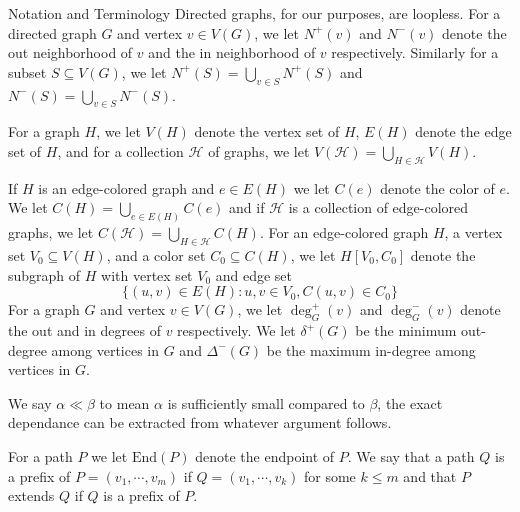 \documentclass[11pt,a4paper]{article}
\newcommand{\End}{\mathrm{End}}
\begin{document}
\begin{section}{Notation and Terminology}
Directed graphs, for our purposes, are loopless. For a directed graph $G$ and vertex $v \in V(G)$, we let $N^+(v)$ and $N^-(v)$ denote the out neighborhood of $v$ and the in neighborhood of $v$ respectively. Similarly for a subset $S \subseteq V(G)$, we let $N^+(S) = \bigcup_{v \in S} N^+(S)$ and $N^-(S) = \bigcup_{v \in S} N^-(S)$.

\medskip

For a graph $H$, we let $V(H)$ denote the vertex set of $H$, $E(H)$ denote the edge set of $H$, and for a collection $\mathcal H$ of graphs, we let $V(\mathcal H) = \bigcup_{H \in \mathcal H} V(H)$.

\medskip

If $H$ is an edge-colored graph and $e \in E(H)$ we let $C(e)$ denote the color of $e$. We let $C(H) = \bigcup_{e \in E(H)} C(e)$ and if $\mathcal H$ is a collection of edge-colored graphs, we let $C(\mathcal H) = \bigcup_{H \in \mathcal H} C(H)$. For an edge-colored graph $H$, a vertex set $V_0 \subseteq V(H)$, and a color set $C_0 \subseteq C(H)$, we let $H[V_0, C_0]$ denote the subgraph of $H$ with vertex set $V_0$ and edge set
\[
\{ (u, v) \in E(H) : u, v \in V_0, C(u, v) \in C_0 \}
\]
For a graph $G$ and vertex $v \in V(G)$, we let $\deg^+_G(v)$ and $\deg^-_G(v)$ denote the out and in degrees of $v$ respectively. We let $\delta^+(G)$ be the minimum out-degree among vertices in $G$ and $\Delta^-(G)$ be the maximum in-degree among vertices in $G$.

\medskip

We say $\alpha \ll \beta$ to mean $\alpha$ is sufficiently small compared to $\beta$, the exact dependance can be extracted from whatever argument follows.

\medskip

For a path $P$ we let $\End(P)$ denote the endpoint of $P$. We say that a path $Q$ is a prefix of $P = (v_1, \cdots, v_m)$ if $Q = (v_1, \cdots, v_k)$ for some $k \leq m$ and that $P$ extends $Q$ if $Q$ is a prefix of $P$.
\end{section}
\end{document}
